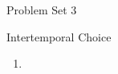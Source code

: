 \documentclass{handout} %
\begin{document}
\centerline{\Large Problem Set 3}
\centerline{\large Intertemporal Choice}


\begin{enumerate} 


\item 


\end{enumerate}




\end{document}
